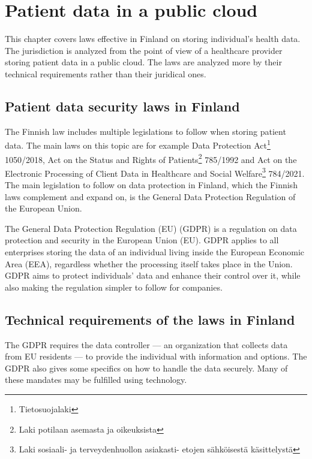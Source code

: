 \chapter{Patient data in a public cloud} \label{data security}

This chapter covers laws effective in Finland on storing individual's health data.
The jurisdiction is analyzed from the point of view of a healthcare provider storing patient data in a public cloud.
The laws are analyzed more by their technical requirements rather than their juridical ones.

\section{Patient data security laws in Finland}

The Finnish law includes multiple legislations to follow when storing patient data.
The main laws on this topic are for example Data Protection Act\footnote{Tietosuojalaki} 1050/2018, Act on the Status and Rights of Patients\footnote{Laki potilaan asemasta ja oikeuksista} 785/1992 and Act on the Electronic Processing of Client Data in Healthcare and Social Welfare\footnote{Laki sosiaali- ja terveydenhuollon asiakasti- etojen sähköisestä käsittelystä} 784/2021.
The main legislation to follow on data protection in Finland, which the Finnish laws complement and expand on, is the General Data Protection Regulation of the European Union.
\cite{valvira}

The General Data Protection Regulation (EU) (GDPR) is a regulation on data protection and security in the European Union (EU).
GDPR applies to all enterprises storing the data of an individual living inside the European Economic Area (EEA), regardless whether the processing itself takes place in the Union.
GDPR aims to protect individuals' data and enhance their control over it, while also making the regulation simpler to follow for companies.
\cite{gdpr}

\section{Technical requirements of the laws in Finland}

The GDPR requires the data controller --- an organization that collects data from EU residents --- to provide the individual with information and options.
The GDPR also gives some specifics on how to handle the data securely.
Many of these mandates may be fulfilled using technology.
\cite{gdpr}

